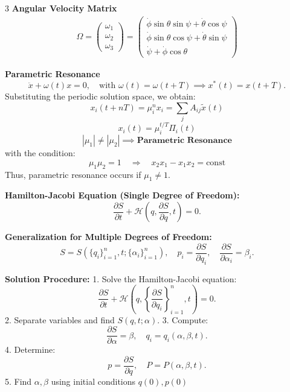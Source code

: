 \documentclass[1pt]{article}
\begin{document}
\begin{multicols}{3}
\textbf{Angular Velocity Matrix}
\begin{align*}
\Omega=
    \begin{pmatrix} \omega_1 \\ \omega_2 \\ \omega_3 \end{pmatrix}
=
\begin{pmatrix} 
\dot{\phi} \sin\theta \sin\psi + \dot{\theta} \cos\psi \\[2mm]
\dot{\phi} \sin\theta \cos\psi + \dot{\theta} \sin\psi \\[2mm]
\dot{\psi} + \dot{\phi} \cos\theta 
\end{pmatrix}
\end{align*}


\textbf{Parametric Resonance}
\[
\ddot{x} + \omega (t) x = 0,\quad \text{with } \omega (t)=\omega (t+T)\implies x^*(t)=x(t+T).
\]
Substituting the periodic solution space, we obtain:
\[
x_i (t + nT) = \mu_i^n x_i = \sum_j A_{ij}\tilde{x}(t)
\]
\[
x_i(t)=\mu_i^{t/T}\Pi_i(t)
\]
\[
\left|\mu_{1}\right|\neq\left|\mu_{2}\right|\implies\textbf{Parametric Resonance}
\]
with the condition:
\[
\mu_1 \mu_2 = 1 \quad \Rightarrow \quad x_2 x_1 - x_1 x_2 = \text{const}
\]
Thus, parametric resonance occurs if \(\mu_1 \neq 1\).

\textbf{Hamilton-Jacobi Equation (Single Degree of Freedom):}
\[
\frac{\partial S}{\partial t} + \mathcal{H} \left( q, \frac{\partial S}{\partial q}, t \right) = 0.
\]

\textbf{Generalization for Multiple Degrees of Freedom:}
\[
S = S \left(\{q_i\}_{i=1}^{n}, t; \{\alpha_i\}_{i=1}^{n} \right),
\quad p_i = \frac{\partial S}{\partial q_i}, \quad
\frac{\partial S}{\partial \alpha_i} = \beta_i.
\]

\textbf{Solution Procedure:}
1. Solve the Hamilton-Jacobi equation:
   \[
   \frac{\partial S}{\partial t} + \mathcal{H} \left( q, \left\{ \frac{\partial S}{\partial q_i} \right\}_{i=1}^{n}, t \right) = 0.
   \]
2. Separate variables and find \( S(q,t;\alpha) \).
3. Compute:
   \[
   \frac{\partial S}{\partial \alpha} = \beta, \quad q_i = q_i(\alpha, \beta, t).
   \]
4. Determine:
   \[
   p = \frac{\partial S}{\partial q}, \quad P = P(\alpha, \beta, t).
   \]
5. Find \( \alpha, \beta \) using initial conditions \( q(0), p(0) \)


\end{multicols}
\end{document}
